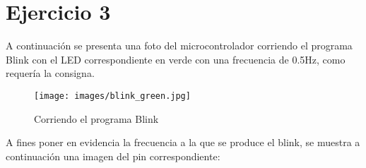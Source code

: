 \documentclass[micros_g1_main.tex]{subfiles}
\begin{document}
\section{Ejercicio 3}
A continuación se presenta una foto del microcontrolador corriendo el programa Blink con el LED correspondiente en verde con una frecuencia de 0.5Hz, como requería la consigna.
	\begin{figure}[H]
		\centering
		\texttt{[image: images/blink\_green.jpg]}
		\caption{Corriendo el programa Blink} \label{fig:cct}
	\end{figure}

A fines poner en evidencia la frecuencia a la que se produce el blink, se muestra a continuación una imagen del pin correspondiente:
\end{document}
